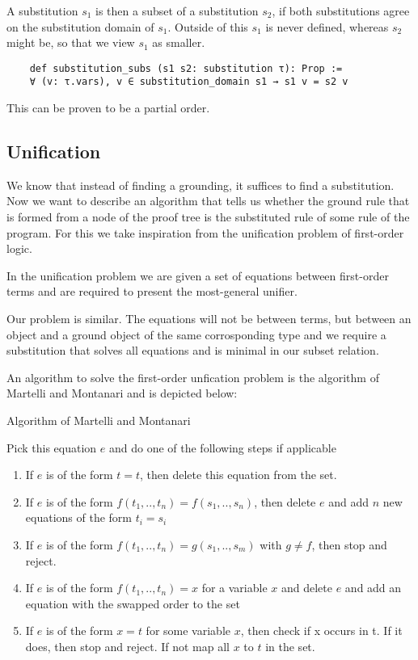     A substitution $s_1$ is then a subset of a substitution $s_2$, if both substitutions agree on the substitution domain of $s_1$. Outside of this $s_1$ is never defined, whereas $s_2$ might be, so that we view $s_1$ as smaller.

    \begin{lstlisting}
    def substitution_subs (s1 s2: substitution τ): Prop :=
    ∀ (v: τ.vars), v ∈ substitution_domain s1 → s1 v = s2 v
    \end{lstlisting}

    This can be proven to be a partial order.

\subsection{Unification}

We know that instead of finding a grounding, it suffices to find a substitution. Now we want to describe an algorithm that tells us whether the ground rule that is formed from a node of the proof tree is the substituted rule of some rule of the program. For this we take inspiration from the unification problem of first-order logic.

In the unification problem we are given a set of equations between first-order terms and are required to present the most-general unifier.

Our problem is similar. The equations will not be between terms, but between an object and a ground object of the same corrosponding type and we require a substitution that solves all equations and is minimal in our subset relation.

An algorithm to solve the first-order unfication problem is the algorithm of Martelli and Montanari \cite{MartMont} and is depicted below:
\begin{algorithm}
    \caption{Algorithm of Martelli and Montanari}
\begin{algorithmic}
    \State Pick this equation $e$ and do one of the following steps if applicable
    \begin{enumerate}
        \item If $e$ is of the form $t = t$, then delete this equation from the set.
        \item If $e$ is of the form $f(t_1, .., t_n) = f(s_1,.., s_n)$, then delete $e$ and add $n$ new equations of the form $t_i = s_i$
        \item If $e$ is of the form $f(t_1, .., t_n) = g(s_1,.., s_m)$ with $g \neq f$, then stop and reject.
        \item If $e$ is of the form $f(t_1,..,t_n) = x$ for a variable $x$ and delete $e$ and add an equation with the swapped order to the set
        \item If $e$ is of the form $x=t$ for some variable $x$, then check if x occurs in t. If it does, then stop and reject. If not map all $x$ to $t$ in the set.
    \end{enumerate}
    \EndWhile
\end{algorithmic}
\end{algorithm}

